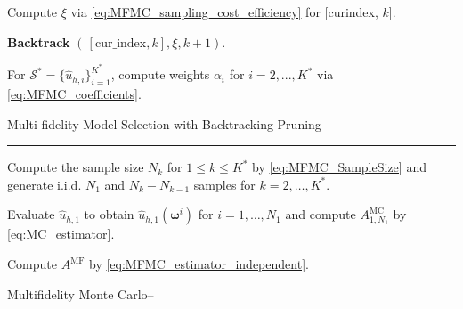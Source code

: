 \begin{algorithm}[!ht]
{{{        Compute $\xi$ via \eqref{eq:MFMC_sampling_cost_efficiency} for  
      [cur\textunderscore index, $k$].

      
      \textbf{Backtrack} $(\, [\text{cur}\_\text{index},k],\xi, k+1)$.
  }
}
}
\vspace{3mm}



For $\mathcal{S}^*=\{\widehat u_{h,i}\}_{i=1}^{K^*}$, compute weights $\alpha_i$ for $i=2,...,K^*$ via \eqref{eq:MFMC_coefficients}. 

\caption{Multi-fidelity Model Selection with Backtracking Pruning--}
\end{algorithm}
\ULforem




\normalem
\begin{algorithm}[!ht]
\label{algo:MFMC_Algo}
\DontPrintSemicolon

    
   \vspace{1ex}
    
    \vspace{1ex}
    \hrule \vspace{1ex}
    

    Compute the sample size $N_k$ for $1\leq k\leq K^*$ by \eqref{eq:MFMC_SampleSize} and generate i.i.d. $N_1$ and $N_k-N_{k-1}$ samples for $k=2,\ldots, K^*$.

    Evaluate $\widehat u_{h, 1}$ to obtain $\widehat u_{h, 1}(\boldsymbol{\omega}^i)$ for $i = 1,\ldots,N_1$ and compute $A_{1,N_1}^{\text{MC}}$ by \eqref{eq:MC_estimator}.
    

    Compute $A^{\text{MF}}$ by \eqref{eq:MFMC_estimator_independent}.
    
\caption{Multifidelity Monte Carlo--}
\end{algorithm}
\ULforem

